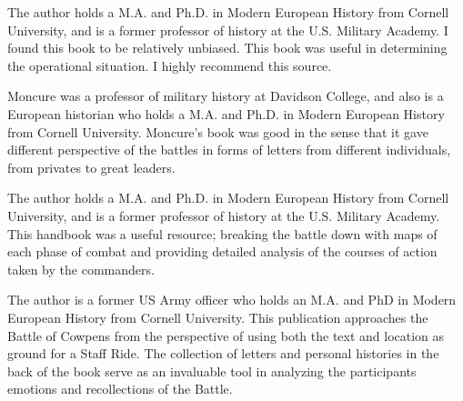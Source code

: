 The author holds a M.A. and Ph.D. in Modern European History
from Cornell University, and is a former professor of history at the U.S.
Military Academy.  I found this book to be relatively unbiased.  This book was
useful in determining the operational situation.  I highly recommend this
source.   

Moncure was a professor of military history at Davidson College, and also is a
European historian who holds a M.A. and Ph.D. in Modern European History from
Cornell University. Moncure's book was good in the sense that it gave different
perspective of the battles in forms of  letters from different individuals,
from privates to great leaders.

The author holds a M.A. and Ph.D. in Modern European History from Cornell
University, and is a former professor of history at the U.S. Military Academy.
This handbook was a useful resource; breaking the battle down with maps of each
phase of combat and providing detailed analysis of the courses of action taken
by the commanders.

The author is a former US Army officer who holds an M.A. and PhD in Modern
European History from Cornell University.  This publication approaches the
Battle of Cowpens from the perspective of using both the text and location as
ground for a Staff Ride.  The collection of letters and personal histories in
the back of the book serve as an invaluable tool in analyzing the participants
emotions and recollections of the Battle.
